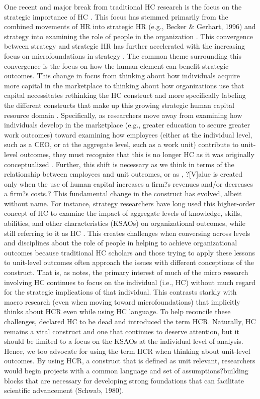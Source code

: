 \documentclass[12pt,letterpaper]{article}
\begin{document}
One recent and major break from traditional HC research is the focus on the strategic importance of HC \citep{Wright2014}. This focus has stemmed primarily from the combined movements of HR into strategic HR (e.g., Becker \& Gerhart, 1996)
and strategy into examining the role of people in the organization \citep{Hitt2001b}. This convergence between strategy and strategic HR has further accelerated with the increasing focus on microfoundations in strategy \citep{Nyberg2014}. The common theme surrounding this convergence is the focus on how the human element can benefit strategic outcomes.
This change in focus from thinking about how individuals acquire more capital in the marketplace to thinking about how organizations use that capital necessitates rethinking the HC construct and more specifically labeling the different constructs that make up this growing strategic human capital resource domain \citep{Wright2014}. Specifically, as researchers move away from examining how individuals
develop in the marketplace (e.g., greater education to secure greater work outcomes) toward examining how employees (either at the individual level, such as a CEO, or at the aggregate level, such as a work unit) contribute to unit-level outcomes, they must recognize that this is no longer HC as it was originally conceptualized \citep{Ployhart2014}. Further, this shift is necessary as we think in
terms of the relationship between employees and unit outcomes, or as \cite{Molloy2015}, ?[V]alue is created only when the use of human capital increases a firm?s revenues and/or decreases a firm?s costs.? This fundamental change in the construct has evolved, albeit without name. For instance, strategy researchers have long used this higher-order concept of HC to examine the impact of aggregate levels of knowledge, skills, abilities, and other characteristics (KSAOs) on organizational outcomes, while
still referring to it as HC \citep{Nyberg2014}. This creates challenges when conversing across levels and disciplines about the role of people in helping to achieve organizational outcomes because traditional HC scholars and those trying to apply these lessons to unit-level outcomes often approach the issues with different conceptions of the construct. That is, as \cite{Ployhart2015} notes, the primary
interest of much of the micro research involving HC continues to focus on the individual (i.e., HC) without much regard for the strategic implications of that individual. This contrasts starkly with macro research (even when moving toward microfoundations) that implicitly thinks about HCR even while using HC language. To help reconcile these challenges, \cite{Ployhart2014} declared HC to be dead and introduced the term HCR. Naturally, HC remains a vital construct and one that continues to deserve attention, but it should be limited to a focus on the KSAOs at the individual level of analysis. Hence, we too advocate for using the term HCR when thinking about unit-level outcomes. By using HCR, a construct that is defined as unit relevant, researchers would begin projects with a common
language and set of assumptions?building blocks that are necessary for developing strong foundations that can facilitate scientific advancement (Schwab, 1980).
\end{document}
